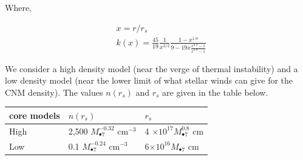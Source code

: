 \documentclass[usenatbib,fleqn]{mn2e}
\newcommand{\Mbh}[1][]{M_{\bullet#1}}
\begin{document}
Where, 

\begin{align}
  &x=r/r_s\\\nonumber
  &k(x)=\frac{45}{19} \frac{1}{x^{3/2}} \frac{1-x^{1.9}}{9-19
      x\frac{x^{0.9}-1}{x^{1.9}-1}}
\end{align}

We consider a high density model (near the verge of thermal
instability) and a low density model (near the lower limit of what
stellar winds can give for the CNM density). The values $n(r_s)$ and
$r_s$ are given in the table below. 

\begin{table}
\begin{tabular}{|l|l|l}
 core models & $n(r_s)$ & $r_s$\\
\hline
 High & 2,500 $\Mbh[7]^{-0.32}$ cm$^{-3}$ &  4 $\times 10^{17}  
 \Mbh[7]^{0.8}$ cm\\
 Low & 0.1 $\Mbh[7]^{-0.24}$ cm$^{-3}$ & 6$\times 10^{16} \Mbh[7]$ cm
\end{tabular}
\end{table}

  \footnotesize{
    
    
  }
\end{document}
